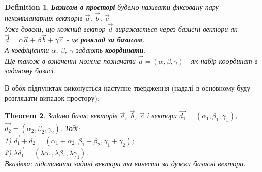 \documentclass[a4paper, 10pt]{extarticle}
\theoremstyle{theoremdd}
\newtheorem{theorem}{Theorem}[subsection]
\theoremstyle{theoremdd}
\newtheorem{definition}[theorem]{Definition}
\theoremstyle{theoremdd}
\theoremstyle{theoremdd}
\theoremstyle{theoremdd}
\theoremstyle{theoremdd}
\theoremstyle{theoremdd}
\theoremstyle{theoremdd}
\begin{document}
\begin{definition}
\textbf{Базисом в просторі} будемо називати фіксовану пару некомпланарних векторів $\vec{a}$, $\vec{b}$, $\vec{c}$\\
Уже довели, що кожний вектор $\vec{d}$ виражається через базисні вектори як $\vec{d} = \alpha \vec{a} + \beta \vec{b} + \gamma \vec{c}$ - це \textbf{розклад за базисом}.\\
А коефіцієнти $\alpha$, $\beta$, $\gamma$ задають \textbf{координати}.
\bigskip \\
Ще також в означенні можна позначати $\vec{d} = (\alpha, \beta, \gamma)$ - як набір координат в заданому базисі.
\end{definition}

В обох підпунктах виконується наступне твердження (надалі в основному буду розглядати випадок простору):
\begin{theorem}
Задано базис векторів $\vec{a}$, $\vec{b}$, $\vec{c}$ і вектори $\vec{d_1} = (\alpha_1, \beta_1, \gamma_1)$, $\vec{d_2} = (\alpha_2, \beta_2, \gamma_2)$. Тоді:\\
	1) $\vec{d_1} + \vec{d_2} = (\alpha_1+\alpha_2, \beta_1+\beta_2, \gamma_1+\gamma_2)$;\\
	2) $\lambda \vec{d_1} = (\lambda \alpha_1, \lambda \beta_1, \lambda \gamma_1)$.\\
	\textit{Вказівка: підставити задані вектори та винести за дужки базисні вектори.}
\end{theorem}
\end{document}
